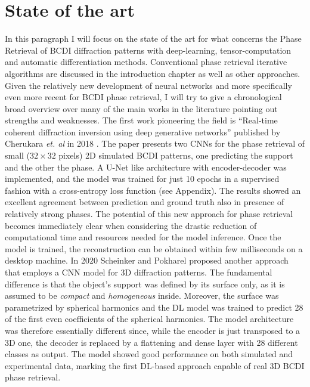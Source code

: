 \section{State of the art}\label{chp:phasing_stateart}
In this paragraph I will focus on the state of the art for what concerns the Phase Retrieval of BCDI diffraction patterns with
deep-learning, tensor-computation and automatic differentiation methods. Conventional phase retrieval iterative algorithms 
are discussed in the introduction chapter as well as other approaches. \\
Given the relatively new development of neural networks and more specifically even more recent for BCDI phase retrieval, I will try
to give a chronological broad overview over many of the main works in the literature pointing out strengths and weaknesses.
The first work pioneering the field is ``Real-time coherent diffraction inversion using deep generative networks'' published
by Cherukara \textit{et. al} in 2018 \cite{cherukara_real-time_2018}. The paper presents two CNNs for the phase retrieval of small ($32\times32$ pixels) 2D 
simulated BCDI patterns, one predicting the support and the other the phase. A U-Net like architecture with 
encoder-decoder was implemented, and the model was trained for just 10 epochs in a supervised fashion with a cross-entropy loss function (see Appendix).
The results showed an excellent agreement between prediction and ground truth also in presence of relatively strong phases. 
The potential of this new approach for phase retrieval becomes immediately clear when considering the drastic reduction of
computational time and resources needed for the model inference. Once the model is trained, the reconstruction can be obtained
within few milliseconds on a desktop machine. In 2020 Scheinker and Pokharel proposed another approach \cite{scheinker_adaptive_2020}
that employs a CNN model for 3D diffraction patterns. The fundamental difference is that the object's support was defined 
by its surface only, as it is assumed to be \textit{compact} and \textit{homogeneous} inside. Moreover, the surface was
parametrized by spherical harmonics and the DL model was trained to predict 28 of the first even coefficients of the spherical
harmonics. The model architecture was therefore essentially different since, while the encoder is just transposed to a 3D 
one, the decoder is replaced by a flattening and dense layer with 28 different classes as output. The model showed good performance
on both simulated and experimental data, marking the first DL-based approach capable of real 3D BCDI phase retrieval.
